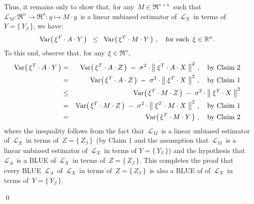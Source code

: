 \begin{enumerate}
	\vskip 0.1cm
	Thus, it remains only to show that, for any \,$M \in \Re^{n \times n}$\, such that
	\,$\mathcal{L}_{M} : \Re^{n} \longrightarrow \Re^{n} : y \longmapsto M \cdot y$\,
	is a linear unbiased estimator of
	\,$\mathcal{L}_{X}$\, in terms of \,$Y = \{\,Y_{\beta}\,\}$,
	we have:
	\begin{equation*}
	\textnormal{Var}\!\left(\,\xi^{T} \cdot A \cdot Y\,\right)
	\;\; \leq \;\;
		\textnormal{Var}\!\left(\,\xi^{T} \cdot M \cdot Y\,\right)\,,
	\quad
	\textnormal{for each \,$\xi \in \mathbb{R}^{n}$}.
	\end{equation*}
	To this end, observe that, for any \,$\xi \in \Re^{n}$,
	\begin{eqnarray*}
	\textnormal{Var}\!\left(\,\xi^{T} \cdot A \cdot Y\,\right)
	& = &
		\textnormal{Var}\!\left(\,\xi^{T} \cdot A \cdot Z\,\right)
		\; - \;
		\sigma^{2} \cdot \left\Vert\; \xi^{T} \cdot A \cdot X \;\right\Vert^{2}\,,
		\quad\textnormal{by Claim 2}
	\\
	& = &
		\textnormal{Var}\!\left(\,\xi^{T} \cdot A \cdot Z\,\right)
		\; - \;
		\sigma^{2} \cdot \left\Vert\; \xi^{T} \cdot X \;\right\Vert^{2}\,,
		\quad\textnormal{by Claim 1}
	\\
	& \leq &
		\textnormal{Var}\!\left(\,\xi^{T} \cdot M \cdot Z\,\right)
		\; - \;
		\sigma^{2} \cdot \left\Vert\; \xi^{T} \cdot X \;\right\Vert^{2}
	\\
	& = &
		\textnormal{Var}\!\left(\,\xi^{T} \cdot M \cdot Z\,\right)
		\; - \;
		\sigma^{2} \cdot \left\Vert\; \xi^{T} \cdot M \cdot X \;\right\Vert^{2}\,,
		\quad\textnormal{by Claim 1}
	\\
	& = &
		\textnormal{Var}\!\left(\,\xi^{T} \cdot M \cdot Y\,\right)\,,
		\quad\textnormal{by Claim 2}
	\end{eqnarray*}
	where the inequality follows from the fact that
	\,$\mathcal{L}_{M}$\, is a linear unbiased estimator of
	\,$\mathcal{L}_{X}$\, in terms of \,$Z = \{\,Z_{\beta}\,\}$\,
	(by Claim 1 and the assumption that \,$\mathcal{L}_{M}$\,
	is a linear unbiased estimator of \,$\mathcal{L}_{X}$\,
	in terms of $Y = \{\,Y_{\beta}\,\}$)
	and the hypothesis that
	\,$\mathcal{L}_{A}$\, is a BLUE of \,$\mathcal{L}_{X}$\,
	in terms of \,$Z = \{\,Z_{\beta}\,\}$.
	This completes the proof that every BLUE \,$\mathcal{L}_{A}$\,
	of \,$\mathcal{L}_{X}$\, in terms of \,$Z = \{\,Z_{\beta}\,\}$\,
	is also a BLUE of
	of \,$\mathcal{L}_{X}$\, in terms of \,$Y = \{\,Y_{\beta}\,\}$.
		
\end{enumerate}
\qed

